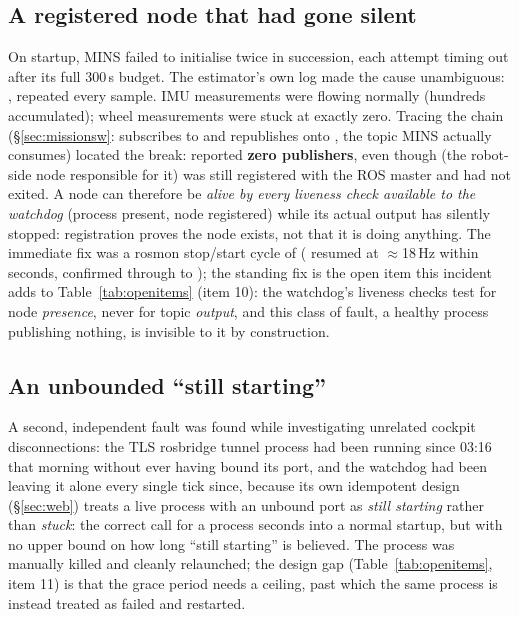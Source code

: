\subsection{A registered node that had gone silent}
\label{sec:jointstates}
On startup, MINS failed to initialise twice in succession, each attempt
timing out after its full 300\,s budget. The estimator's own log made the
cause unambiguous: , repeated every sample. IMU measurements were flowing
normally (hundreds accumulated); wheel measurements were stuck at exactly
zero. Tracing the chain (\S\ref{sec:missionsw}: 
subscribes to  and republishes onto
, the topic MINS actually consumes) located the
break:  reported \textbf{zero
publishers}, even though  (the
robot-side node responsible for it) was still registered with the ROS
master and had not exited. A node can therefore be \emph{alive by every
liveness check available to the watchdog} (process present, node
registered) while its actual output has silently stopped: registration
proves the node exists, not that it is doing anything. The immediate fix
was a rosmon stop/start cycle of 
( resumed at $\approx$18\,Hz within seconds, confirmed
through to ); the standing fix is the open item
this incident adds to Table~\ref{tab:openitems} (item 10): the watchdog's
liveness checks test for node \emph{presence}, never for topic
\emph{output}, and this class of fault, a healthy process publishing
nothing, is invisible to it by construction.

\subsection{An unbounded ``still starting''}
A second, independent fault was found while investigating unrelated cockpit
disconnections: the TLS rosbridge tunnel process had been running since
03:16 that morning without ever having bound its port, and the watchdog had
been leaving it alone every single tick since, because its own idempotent
design (\S\ref{sec:web}) treats a live process with an unbound port as
\emph{still starting} rather than \emph{stuck}: the correct call for a
process seconds into a normal startup, but with no upper bound on how long
``still starting'' is believed. The process was manually killed and cleanly
relaunched; the design gap (Table~\ref{tab:openitems}, item 11) is that the
grace period needs a ceiling, past which the same process is instead
treated as failed and restarted.

